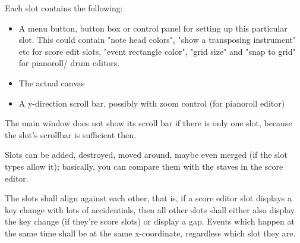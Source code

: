 \documentclass[a4paper]{report}
\begin{document}
Each slot contains the following:
\begin{itemize}
\item A menu button, button box or control panel for setting up this
      particular slot. This could contain "note head colors", "show
      a transposing instrument" etc for score edit slots, "event
      rectangle color", "grid size" and "snap to grid" for pianoroll/
      drum editors.
\item The actual canvas
\item A y-direction scroll bar, possibly with zoom control (for
      pianoroll editor)
\end{itemize}

The main window does not show its scroll bar if there is only one slot,
because the slot's scrollbar is sufficient then.

Slots can be added, destroyed, moved around, maybe even merged (if the
slot types allow it); basically, you can compare them with the staves
in the score editor.

The slots shall align against each other, that is, if a score editor
slot displays a key change with lots of accidentials, then all other
slots shall either also display the key change (if they're score slots)
or display a gap. Events which happen at the same time shall be at the
same x-coordinate, regardless which slot they are.
\end{document}
